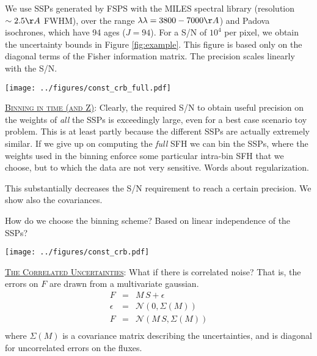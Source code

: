 \documentclass{article}
\begin{document}
We use SSPs generated by FSPS with 
the MILES spectral library (resolution $\sim 2.5\AA$ FWHM), over the range $\lambda\lambda = 3800-7000\AA$) and 
Padova isochrones, which have 94 ages ($J=94$).
For a S/N of $10^4$ per pixel, we obtain the uncertainty bounds in Figure \ref{fig:example}.
This figure is based only on the diagonal terms of the Fisher information matrix.
The precision scales linearly with the S/N.

\begin{figure*}[h!]
\texttt{[image: ../figures/const\_crb\_full.pdf]}
\caption{Top: Input masses and Cramer-Rao bound for a constant SFH, single metallicity, and S/N$= 10^4$, when including all 94 isochrone ages.  Bottom: Ratio of the input mass to the Cramer-Rao bound. 
\label{fig:example}}
\end{figure*}



\underline{\textsc{Binning in time (and Z)}}:
Clearly, the required S/N to obtain useful precision on the weights of \emph{all} the SSPs is exceedingly large, even for a best case scenario toy problem.  
This is at least partly because the different SSPs are actually extremely similar.  
If we give up on computing the \emph{full} SFH we can bin the SSPs, 
where the weights used in the binning enforce some particular intra-bin SFH that we choose, but to which the data are not very sensitive.
Words about regularization.

This substantially decreases the S/N requirement to reach a certain precision.  We show also the covariances.

How do we choose the binning scheme?  Based on linear independence of the SSPs?

\begin{figure*}[h!]
\texttt{[image: ../figures/const\_crb.pdf]}
\caption{Top: Input masses and Cramer-Rao bound for a constant SFH, single metallicity, and S/N$= 10^2$, when the SSPs are rebinned to a 10-segement piecewise constant SFH.  Bottom: Ratio of the input mass to the Cramer-Rao bound. 
\label{fig:example_bin}}
\end{figure*}



\underline{\textsc{The Correlated Uncertainties}}:
What if there is correlated noise? That is, the errors on $F$ are drawn from a multivariate gaussian.
\begin{eqnarray}
F & = & M \, S + \epsilon \\
\epsilon & = & \mathcal{N}(0, \Sigma(M)) \\
F & = & \mathcal{N}(M \, S, \Sigma(M)) \\
\end{eqnarray}
where $\Sigma(M)$ is a covariance matrix describing the uncertainties, and is diagonal for uncorrelated errors on the fluxes.
\end{document}
